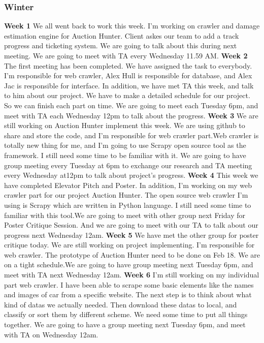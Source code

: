 \documentclass[onecolumn, draftclsnofoot, 10pt, compsoc]{IEEEtran}
\begin{document}
\subsubsection{Winter}
\textbf{Week 1}
We all went back to work this week. I'm working on crawler and damage estimation engine for Auction Hunter. Client askes our team to add a track progress and ticketing system. We are going to talk about this during next meeting. We are going to meet with TA every Wednesday 11.59 AM.
\newline
\textbf{Week 2}
The first meeting has been completed. We have assigned the task to everybody.  I'm responsible for web crawler, Alex Hull is responsible for database, and Alex Jac is responsible for interface. In addition, we have met TA this week, and talk to him about our project. We have to make a detailed schedule for our project. So we can finish each part on time. We are going to meet each Tuesday 6pm, and meet with TA each Wednesday 12pm to talk about the progress.
\newline
\textbf{Week 3}
We are still working on Auction Hunter implement this week. We are using github to share and store the code, and I'm responsible for web crawler part.Web crawler is totally new thing for me, and I'm going to use Scrapy open source tool as the framework. I still need some time to be familiar with it. We are going to have group meeting every Tuesday at 6pm to exchange our research and TA meeting every Wednesday at12pm to talk about project's progress.
\newline
\textbf{Week 4}
This week we have completed Elevator Pitch and Poster. In addition, I'm working on my web crawler part for our project Auction Hunter. The open source web crawler I'm using is Scrapy which are written in Python language.  I still need some time to familiar with this tool.We are going to meet with other group next Friday for Poster Critique Session. And we are going to meet with our TA to talk about our progress next Wednesday 12am.
\newline
\textbf{Week 5}
We have met the other group  for poster critique today. We are still working on project implementing. I'm responsible for web crawler. The prototype of Auction Hunter need to be done on Feb 18. We are on a tight schedule.We are going to have group meeting next Tuesday 6pm, and meet with TA next Wednesday 12am.
\newline
\textbf{Week 6}
I'm still working on my individual part web crawler. I have been able to scrape some basic elements like the names and images of car from a specific website. The next step is to think about what kind of datas we actually needed. Then download these datas to local, and classify or sort them by different scheme. We need some time to put all things together. We are going to have a group meeting next Tuesday 6pm, and meet with TA on Wednesday 12am.
\end{document}
